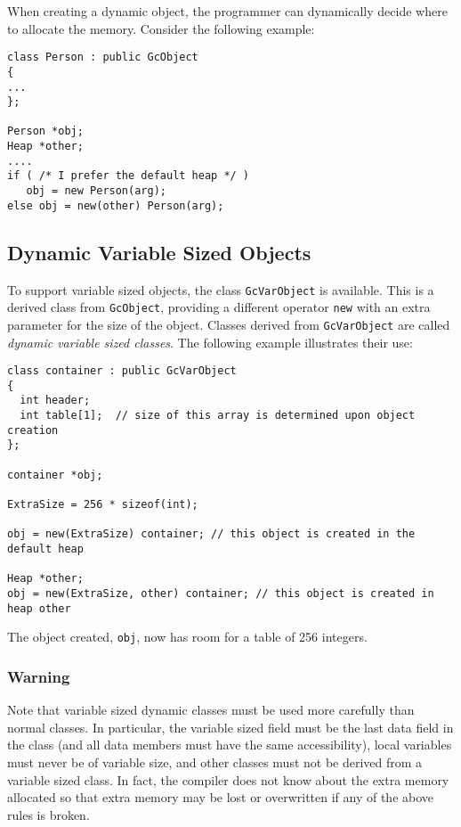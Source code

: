 When creating a dynamic object, the 
programmer can dynamically decide where to allocate the memory. 
Consider the following example:

\begin{verbatim}
class Person : public GcObject
{
...
};

Person *obj;
Heap *other;
....
if ( /* I prefer the default heap */ )
   obj = new Person(arg);
else obj = new(other) Person(arg);
\end{verbatim}


\subsection{Dynamic Variable Sized Objects}

To support variable sized objects, the class {\tt GcVarObject} is
available.  This is a derived class from {\tt GcObject}, providing a
different operator {\tt new} with an extra parameter for the size of
the object.  Classes derived from {\tt GcVarObject} are called {\it
dynamic variable sized classes\/}.  The following example illustrates
their use:

\begin{verbatim}
class container : public GcVarObject
{
  int header;
  int table[1];  // size of this array is determined upon object creation
};

container *obj;

ExtraSize = 256 * sizeof(int);

obj = new(ExtraSize) container; // this object is created in the default heap

Heap *other;
obj = new(ExtraSize, other) container; // this object is created in heap other
\end{verbatim}
The object created, {\tt obj}, now has room for a table of 256 integers.

\subsubsection*{Warning}

Note that variable sized dynamic classes must be used more carefully than
normal classes.  In particular, the variable sized field must be the last data
field in the class (and all data members must have the same accessibility),
local variables must never be of variable size, and other classes must not be
derived from a variable sized class.  In fact, the compiler does not know about
the extra memory allocated so that extra memory may be lost or overwritten
if any of the above rules is broken.


